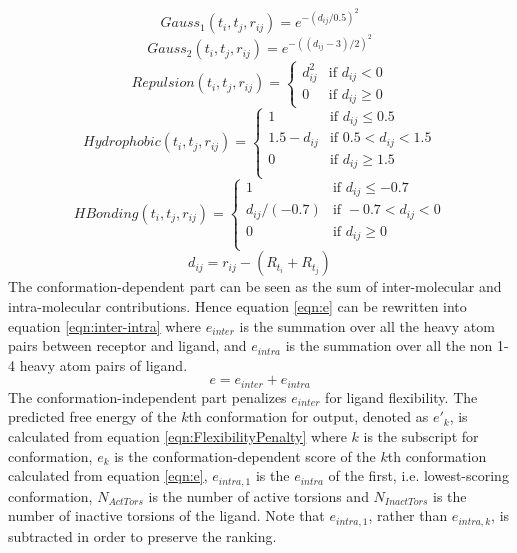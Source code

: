 \documentclass[10pt]{article}
\begin{document}
\begin{equation}
\label{eqn:Gauss1}
Gauss_1(t_i, t_j, r_{ij}) = e^{-(d_{ij} / 0.5)^2}
\end{equation}
\begin{equation}
\label{eqn:Gauss2}
Gauss_2(t_i, t_j, r_{ij}) = e^{-((d_{ij} - 3) / 2)^2}
\end{equation}
\begin{equation}
\label{eqn:Repulsion}
Repulsion(t_i, t_j, r_{ij}) =
\begin{cases}
d_{ij}^2 & \text{if } d_{ij} < 0\\
0 &\text{if } d_{ij} \geq 0
\end{cases}
\end{equation}
\begin{equation}
\label{eqn:Hydrophobic}
Hydrophobic(t_i, t_j, r_{ij}) =
\begin{cases}
1 & \text{if } d_{ij} \leq 0.5\\
1.5 - d_{ij} & \text{if } 0.5 < d_{ij} < 1.5\\
0 & \text{if } d_{ij} \geq 1.5\\
\end{cases}
\end{equation}
\begin{equation}
\label{eqn:HBonding}
HBonding(t_i, t_j, r_{ij}) =
\begin{cases}
1 & \text{if } d_{ij} \leq -0.7\\
d_{ij} / (-0.7) & \text{if } -0.7 < d_{ij} < 0\\
0 & \text{if } d_{ij} \geq 0\\
\end{cases}
\end{equation}
\begin{equation}
\label{eqn:dij}
d_{ij} = r_{ij} - (R_{t_i} + R_{t_j})
\end{equation}
The conformation-dependent part can be seen as the sum of inter-molecular and intra-molecular contributions. Hence equation \eqref{eqn:e} can be rewritten into equation \eqref{eqn:inter-intra} where $e_{inter}$ is the summation over all the heavy atom pairs between receptor and ligand, and $e_{intra}$ is the summation over all the non 1-4 heavy atom pairs of ligand.
\begin{equation}
\label{eqn:inter-intra}
e = e_{inter} + e_{intra}
\end{equation}
The conformation-independent part penalizes $e_{inter}$ for ligand flexibility. The predicted free energy of the $k$th conformation for output, denoted as $e'_k$, is calculated from equation \eqref{eqn:FlexibilityPenalty} where $k$ is the subscript for conformation, $e_k$ is the conformation-dependent score of the $k$th conformation calculated from equation \eqref{eqn:e}, $e_{intra,1}$ is the $e_{intra}$ of the first, i.e. lowest-scoring conformation, $N_{ActTors}$ is the number of active torsions and $N_{InactTors}$ is the number of inactive torsions of the ligand. Note that $e_{intra,1}$, rather than $e_{intra,k}$, is subtracted in order to preserve the ranking.
\end{document}
